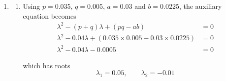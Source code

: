 \documentclass[leqno]{article}
\begin{document}
\begin{enumerate}[
  label=\textbf{\arabic*.},
  leftmargin=*,
  topsep=0pt,
  partopsep=0pt,
  parsep=0pt
]
\begin{djsSolution}
\begin{enumerate}[label=\textbf{(\alph*)}]
\begin{enumerate}[label=(\roman*)]
    Rearranging:
    \[
    \frac{\mathrm{d}^2x}{\mathrm{d}t^2}-(p+q)\frac{\mathrm{d}x}{\mathrm{d}t}+(pq-ab)x=0
    \]

    as required.

    Substituting $x=e^{\lambda t}$ gives
    \[
    \left(\lambda^2-(p+q)\lambda+(pq-ab)\right)e^{\lambda t}=0
    \]

    and, since $e^{\lambda t}\neq 0$, the auxiliary equation is
    \[
    \lambda^2-(p+q)\lambda+(pq-ab)=0
    \]

    If its roots $\lambda_1$ and $\lambda_2$ are distinct, then $e^{\lambda_1 t}$ and $e^{\lambda_2 t}$ are both solutions, and the general solution is
    \[
    x=Ae^{\lambda_1 t}+Be^{\lambda_2 t}
    \]

    \item From
    \[
    \frac{\mathrm{d}x}{\mathrm{d}t}=px-ay
    \]

    we have
    \[
    y=\frac{px-\frac{\mathrm{d}x}{\mathrm{d}t}}{a}
    \]

    Now
    \[
    x=Ae^{\lambda_1 t}+Be^{\lambda_2 t}
    \]

    so
    \[
    \frac{\mathrm{d}x}{\mathrm{d}t}=\lambda_1Ae^{\lambda_1 t}+\lambda_2Be^{\lambda_2 t}
    \]

    Hence
    \begin{align*}
    y&=\frac{p\left(Ae^{\lambda_1 t}+Be^{\lambda_2 t}\right)-\left(\lambda_1Ae^{\lambda_1 t}+\lambda_2Be^{\lambda_2 t}\right)}{a} \\
    &=\frac{p-\lambda_1}{a}Ae^{\lambda_1 t}+\frac{p-\lambda_2}{a}Be^{\lambda_2 t}
    \end{align*}

    as required.
  \end{enumerate}

  \item
  \begin{enumerate}[label=(\roman*)]
    \item Using $p=0.035$, $q=0.005$, $a=0.03$ and $b=0.0225$, the auxiliary equation becomes
    \begin{align*}
    \lambda^2-(p+q)\lambda+(pq-ab)&=0 \\
    \lambda^2-0.04\lambda+\left(0.035\times 0.005-0.03\times 0.0225\right)&=0 \\
    \lambda^2-0.04\lambda-0.0005&=0
    \end{align*}

    which has roots
    \[
    \lambda_1=0.05,\qquad \lambda_2=-0.01
    \]


\end{enumerate}
\end{enumerate}
\end{djsSolution}
\end{enumerate}
\end{document}
